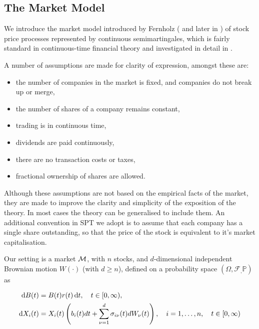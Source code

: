 \documentclass[british]{amsart} \usepackage{lmodern}
\numberwithin{equation}{section} \numberwithin{figure}{section}
\theoremstyle{plain} \newtheorem{thm}{\protect\theoremname}[section]
\theoremstyle{definition} \newtheorem{defn}[thm]{\protect\definitionname}
\theoremstyle{plain} \newtheorem{assumption}[thm]{\protect\assumptionname}
\theoremstyle{plain} \newtheorem{lem}[thm]{\protect\lemmaname}
\theoremstyle{plain} \newtheorem{prop}[thm]{\protect\propositionname}
\theoremstyle{remark} \newtheorem{rem}[thm]{\protect\remarkname}
\theoremstyle{plain} \newtheorem{cor}[thm]{\protect\corollaryname}
\renewcommand{\d}[1]{\mathop{\mathrm{d}{#1}}}
\newcommand{\filtration}[1]{\mathcal{F}_{#1}}
\newcommand{\rangei}{i=1,\dots,n} \newcommand{\measure}{\mathbb{P}}
\newcommand{\probabilityspace}{(\Omega,\filtration,\measure)}
\begin{document}
\subsection{The Market Model}

We introduce the market model introduced by Fernholz (\cite{fernholz1999pgf} and
later in \cite{fernholz2009}) of stock price processes represented by continuous
semimartingales, which is fairly standard in continuous-time financial theory
and investigated in detail in \cite{karatzas1998}.

A number of assumptions are made for clarity of expression, amongst these are:

\begin{itemize}
  \item the number of companies in the market is fixed, and companies do not 
        break up or merge,
  \item the number of shares of a company remains constant,
  \item trading is in continuous time,
  \item dividends are paid continuously,
  \item there are no transaction costs or taxes,
  \item fractional ownership of shares are allowed.
\end{itemize}

Although these assumptions are not based on the empirical facts of the market,
they are made to improve the clarity and simplicity of the exposition of the
theory. In most cases the theory can be generalised to include them. An
additional convention in SPT we adopt is to assume that each company has a
single share outstanding, so that the price of the stock is equivalent to it's
market capitalisation.

Our setting is a market $\mathcal{M}$, with $n$ stocks, and $d$-dimensional
independent Brownian motion $W(\cdot)$ (with $d \ge n$), defined on a
probability space $\probabilityspace$ as

\begin{gather}
  \label{eq:marketmodel}
  \begin{split}
    \d{B(t)} &= B(t)r(t)\d{t},  
      \quad \ranget, \\
    \d{X_{i}(t)} &= 
          X_{i}(t) 
          \left(
              b_{i}(t)dt + \sum_{\nu=1}^{d} \sigma_{i\nu}(t) dW_{\nu}(t)
          \right),
      \quad \rangei,
      \quad \ranget
  \end{split}
\end{gather}
\end{document}
